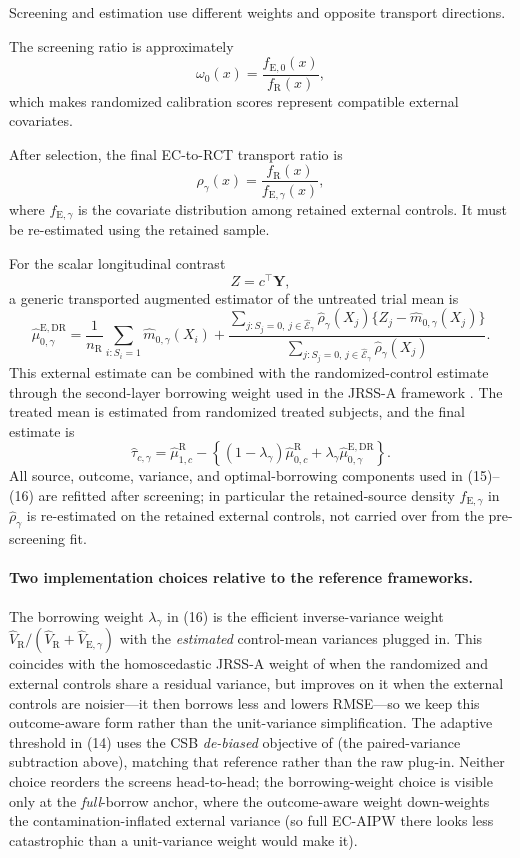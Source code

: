 \documentclass[11pt]{article}
\newcommand{\R}{\mathrm{R}}
\newcommand{\E}{\mathrm{E}}
\begin{document}
Screening and estimation use different weights and opposite transport directions.

The screening ratio is approximately
\[
\omega_0(x)=\frac{f_{\E,0}(x)}{f_{\R}(x)},
\]
which makes randomized calibration scores represent compatible external covariates.

After selection, the final EC-to-RCT transport ratio is
\[
\rho_{\gamma}(x)
=
\frac{f_{\R}(x)}{f_{\E,\gamma}(x)},
\]
where $f_{\E,\gamma}$ is the covariate distribution among retained external controls. It must be re-estimated using the retained sample.

For the scalar longitudinal contrast
\[
Z=c^{\top}\bm Y,
\]
a generic transported augmented estimator of the untreated trial mean is
\[
\widehat\mu_{0,\gamma}^{\E,\mathrm{DR}}
=
\frac{1}{n_{\R}}\sum_{i:S_i=1}\widehat m_{0,\gamma}(X_i)
+
\frac{
\sum_{j:S_j=0,\,j\in\widehat{\mathcal E}_{\gamma}}
\widehat\rho_{\gamma}(X_j)
\{Z_j-\widehat m_{0,\gamma}(X_j)\}
}
{
\sum_{j:S_j=0,\,j\in\widehat{\mathcal E}_{\gamma}}
\widehat\rho_{\gamma}(X_j)
}.
\tag{15}
\]
This external estimate can be combined with the randomized-control estimate through the second-layer borrowing weight used in the JRSS-A framework \citep{zhou2025causal}. The treated mean is estimated from randomized treated subjects, and the final estimate is
\[
\widehat\tau_{c,\gamma}
=
\widehat\mu_{1,c}^{\R}
-
\left\{(1-\lambda_\gamma)\widehat\mu_{0,c}^{\R}
+\lambda_\gamma\widehat\mu_{0,\gamma}^{\E,\mathrm{DR}}\right\}.
\tag{16}
\]
All source, outcome, variance, and optimal-borrowing components used in (15)--(16) are refitted after screening; in particular the retained-source density $f_{\E,\gamma}$ in $\widehat\rho_\gamma$ is re-estimated on the retained external controls, not carried over from the pre-screening fit.

\paragraph{Two implementation choices relative to the reference frameworks.} The borrowing weight $\lambda_\gamma$ in (16) is the efficient inverse-variance weight $\widehat V_{\R}/(\widehat V_{\R}+\widehat V_{\E,\gamma})$ with the \emph{estimated} control-mean variances plugged in. This coincides with the homoscedastic JRSS-A weight of \citet{zhou2025causal} when the randomized and external controls share a residual variance, but improves on it when the external controls are noisier---it then borrows less and lowers RMSE---so we keep this outcome-aware form rather than the unit-variance simplification. The adaptive threshold in (14) uses the CSB \emph{de-biased} objective of \citet{zhu2025csb} (the paired-variance subtraction above), matching that reference rather than the raw plug-in. Neither choice reorders the screens head-to-head; the borrowing-weight choice is visible only at the \emph{full}-borrow anchor, where the outcome-aware weight down-weights the contamination-inflated external variance (so full EC-AIPW there looks less catastrophic than a unit-variance weight would make it).
\end{document}
